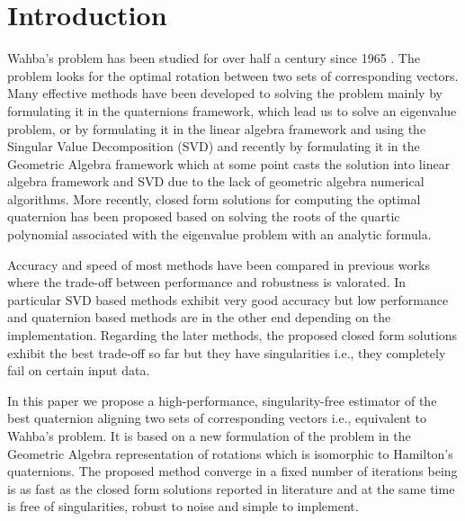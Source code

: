 \documentclass{birkjour}
\numberwithin{equation}{section}
\begin{document}
\maketitle
\section{Introduction}

\indent Wahba's problem has been studied for over half a century since 1965 \cite{Wahba1965}. The problem looks for the optimal rotation between two sets of corresponding vectors. Many effective methods have been developed to solving the problem \cite{Arun1987, Horn1987, Mortari1996, Shuster1981, Yang2015} mainly by formulating it in the quaternions framework, which lead us to solve an eigenvalue problem, or by formulating it in the linear algebra framework and using the Singular Value Decomposition (SVD) and recently by formulating it in the Geometric Algebra framework \cite{Perwass2009, Dorst2011} which at some point casts the solution into linear algebra framework and SVD due to the lack of geometric algebra numerical algorithms. More recently, closed form solutions for computing the optimal quaternion has been proposed \cite{Wu2017, FA3R, FS3R} based on solving the roots of the quartic polynomial associated with the eigenvalue problem with an analytic formula.

Accuracy and speed of most methods have been compared in previous works \cite{Wu2017} where the trade-off between performance and robustness is valorated. In particular SVD based methods exhibit very good accuracy but low performance and quaternion based methods are in the other end depending on the implementation. Regarding the later methods, the proposed closed form solutions exhibit the best trade-off so far but they have singularities i.e., they completely fail on certain input data.

In this paper we propose a high-performance, singularity-free estimator of the best quaternion aligning two sets of corresponding vectors i.e., equivalent to Wahba's problem. It is based on a new formulation of the problem  in the Geometric Algebra representation of rotations which is isomorphic to Hamilton's quaternions.  The proposed method converge in a fixed number of iterations being is as fast as the closed form solutions reported in literature and at the same time is free of singularities, robust to noise and simple to implement.
\end{document}
